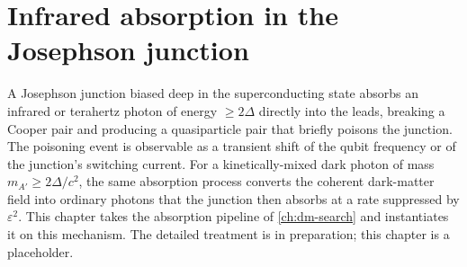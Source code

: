 \chapter{Infrared absorption in the Josephson junction}
\label{ch:ir-junction}

A Josephson junction biased deep in the superconducting state
absorbs an infrared or terahertz photon of energy $\geq 2\Delta$
directly into the leads, breaking a Cooper pair and producing a
quasiparticle pair that briefly poisons the junction. The poisoning
event is observable as a transient shift of the qubit frequency or
of the junction's switching current. For a kinetically-mixed dark
photon of mass $m_{A'}\geq 2\Delta/c^2$, the same absorption
process converts the coherent dark-matter field into ordinary
photons that the junction then absorbs at a rate suppressed by
$\varepsilon^2$. This chapter takes the absorption pipeline of
\cref{ch:dm-search} and instantiates it on this mechanism. The
detailed treatment is in preparation; this chapter is a placeholder.
